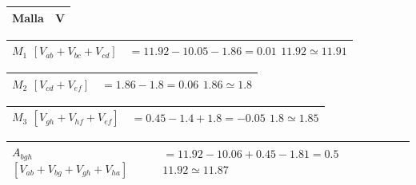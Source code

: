 \documentclass[twocolumn, 12pt]{article}
\begin{document}
\begin{table}[H]
    \captionsetup{justification=centering}
    \centering

    \begin{tabularx}{0.9\linewidth}{|>{\centering\arraybackslash}X|>{\centering\arraybackslash}X|}
        \hline

        \textbf{Malla} & \textbf{V} \\\hline

    \end{tabularx}

    \begin{tabularx}{0.9\linewidth}{|>{\centering\arraybackslash}X|>{\centering\arraybackslash}X|}
        \hline
        $M_1$ \linebreak $[V_{ab} + V_{bc} + V_{cd}]$ &
        $= 11.92 - 10.05 - 1.86 = 0.01$ \linebreak
        $11.92 \simeq 11.91$                            \\ \hline
    \end{tabularx}

    \begin{tabularx}{0.9\linewidth}{|>{\centering\arraybackslash}X|>{\centering\arraybackslash}X|}
        \hline
        $M_2$ \linebreak $[V_{cd} + V_{ef}]$ &
        $= 1.86 - 1.8 = 0.06$ \linebreak
        $1.86 \simeq 1.8$                      \\\hline
    \end{tabularx}

    \begin{tabularx}{0.9\linewidth}{|>{\centering\arraybackslash}X|>{\centering\arraybackslash}X|}
        \hline
        $M_3$ \linebreak $[V_{gh} + V_{hf} + V_{ef}]$ &
        $= 0.45 - 1.4 + 1.8 = -0.05$ \linebreak
        $1.8 \simeq 1.85$                               \\ \hline
    \end{tabularx}

    \begin{tabularx}{0.9\linewidth}{|>{\centering\arraybackslash}X|>{\centering\arraybackslash}X|}
        \hline
        $A_{bgh}$ \linebreak $[V_{ab} + V_{bg} + V_{gh} + V_{ha}]$ &
        $= 11.92 - 10.06 + 0.45 - 1.81 = 0.5$ \linebreak
        $11.92 \simeq 11.87$                                         \\\hline
    \end{tabularx}


\end{table}
\end{document}
